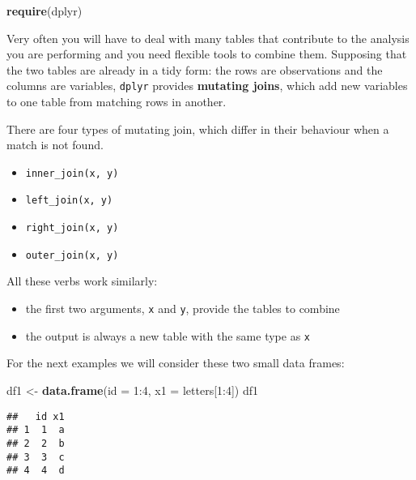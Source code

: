 \documentclass[]{book}
\newenvironment{Shaded}{\begin{snugshade}}{\end{snugshade}}
\newcommand{\KeywordTok}[1]{\textcolor[rgb]{0.13,0.29,0.53}{\textbf{{#1}}}}
\newcommand{\DataTypeTok}[1]{\textcolor[rgb]{0.13,0.29,0.53}{{#1}}}
\newcommand{\DecValTok}[1]{\textcolor[rgb]{0.00,0.00,0.81}{{#1}}}
\newcommand{\StringTok}[1]{\textcolor[rgb]{0.31,0.60,0.02}{{#1}}}
\newcommand{\NormalTok}[1]{{#1}}
\providecommand{\tightlist}{%
  \setlength{\itemsep}{0pt}\setlength{\parskip}{0pt}}
\def\tightlist{}
\begin{document}
\begin{Shaded}
\begin{Highlighting}[]
\KeywordTok{require}\NormalTok{(dplyr)}
\end{Highlighting}
\end{Shaded}

Very often you will have to deal with many tables that contribute to the
analysis you are performing and you need flexible tools to combine them.
Supposing that the two tables are already in a tidy form: the rows are
observations and the columns are variables, \texttt{dplyr} provides
\textbf{mutating joins}, which add new variables to one table from
matching rows in another.

There are four types of mutating join, which differ in their behaviour
when a match is not found.

\begin{itemize}
\tightlist
\item
  \texttt{inner\_join(x,\ y)}
\item
  \texttt{left\_join(x,\ y)}
\item
  \texttt{right\_join(x,\ y)}
\item
  \texttt{outer\_join(x,\ y)}
\end{itemize}

All these verbs work similarly:

\begin{itemize}
\tightlist
\item
  the first two arguments, \texttt{x} and \texttt{y}, provide the tables
  to combine
\item
  the output is always a new table with the same type as \texttt{x}
\end{itemize}

For the next examples we will consider these two small data frames:

\begin{Shaded}
\begin{Highlighting}[]
\NormalTok{df1 <-}\StringTok{ }\KeywordTok{data.frame}\NormalTok{(}\DataTypeTok{id =} \DecValTok{1}\NormalTok{:}\DecValTok{4}\NormalTok{, }\DataTypeTok{x1 =} \NormalTok{letters[}\DecValTok{1}\NormalTok{:}\DecValTok{4}\NormalTok{])}
\NormalTok{df1}
\end{Highlighting}
\end{Shaded}

\begin{verbatim}
##   id x1
## 1  1  a
## 2  2  b
## 3  3  c
## 4  4  d
\end{verbatim}
\end{document}
